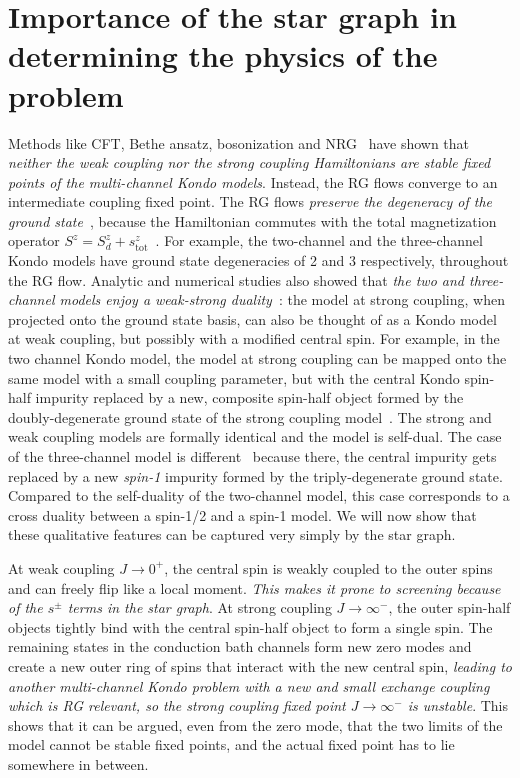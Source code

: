\documentclass[12pt]{revtex4-2}
\begin{document}
\section{Importance of the star graph in determining the physics of the problem}
Methods like CFT, Bethe ansatz, bosonization and NRG~\cite{affleck_1991_overscreen,Tsvelick_Weigmann_mchannel_1984,Gan_mchannel_1994,pang_cox_1991,emery_kivelson,vondelft_prl_1998} have shown that \textit{neither the weak coupling nor the strong coupling Hamiltonians are stable fixed points of the multi-channel Kondo models}. Instead, the RG flows converge to an intermediate coupling fixed point. The RG flows \textit{preserve the degeneracy of the ground state}~\cite{pang_cox_1991,kroha_kolf_2007,zitko_fabrizio_2017}, because the Hamiltonian commutes with the total magnetization operator \(S^z = S_d^z + s_\text{tot}^z\)~\cite{vondelft_prl_1998}. For example, the two-channel and the three-channel Kondo models have ground state degeneracies of 2 and 3 respectively, throughout the RG flow. Analytic and numerical studies also showed that \textit{the two and three-channel models enjoy a weak-strong duality}~\cite{kroha_kolf_2007,zitko_fabrizio_2017}: the model at strong coupling, when projected onto the ground state basis, can also be thought of as a Kondo model at weak coupling, but possibly with a modified central spin. For example, in the two channel Kondo model, the model at strong coupling can be mapped onto the same model with a small coupling parameter, but with the central Kondo spin-half impurity replaced by a new, composite spin-half object formed by the doubly-degenerate ground state of the strong coupling model~\cite{kroha_kolf_2007}. The strong and weak coupling models are formally identical and the model is self-dual. The case of the three-channel model is different~\cite{zitko_fabrizio_2017} because there, the central impurity gets replaced by a new \textit{spin-1} impurity formed by the triply-degenerate ground state. Compared to the self-duality of the two-channel model, this case corresponds to a cross duality between a spin-1/2 and a spin-1 model. We will now show that these qualitative features can be captured very simply by the star graph.

At weak coupling \(J \to 0^+\), the central spin is weakly coupled to the outer spins and can freely flip like a local moment. \textit{This makes it prone to screening because of the \(s^\pm\) terms in the star graph}. At strong coupling \(J \to \infty^-\), the outer spin-half objects tightly bind with the central spin-half object to form a single spin. The remaining states in the conduction bath channels form new zero modes and create a new outer ring of spins that interact with the new central spin, \textit{leading to another multi-channel Kondo problem with a new and small exchange coupling which is RG relevant, so the strong coupling fixed point \(J \to \infty^-\) is unstable}. This shows that it can be argued, even from the zero mode, that the two limits of the model cannot be stable fixed points, and the actual fixed point has to lie somewhere in between.
\end{document}
